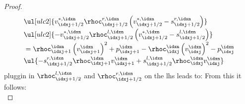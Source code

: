 \begin{proofbox}
\begin{proof}
\begin{align*}
          &\ul[ulc2]{v_{\idxj+1/2}^{*,\idxn}\rhoc_{\idxj+1/2}^{r,\idxn}\left(v_{\idxj+1/2}^{*,\idxn}-s_{\idxj+1/2}^{r,\idxn}\right)}
            \\[-1\jot]
        &\ul[ulc2]{-v_{\idxj+1/2}^{*,\idxn}\rhoc_{\idxj+1/2}^{l,\idxn}\left(v_{\idxj+1/2}^{*,\idxn}-s_{\idxj+1/2}^{l,\idxn}\right)
            }\\[-1\jot]
          &=\rhoc_{\idxj+1}^{\idxn}\left(v_{\idxj+1}^{\idxn}\right)^{2}+p_{\idxj+1}^{\idxn}
            -\rhoc_{\idxj}^{\idxn}\left(v_{\idxj}^{\idxn}\right)^{2}-p_{\idxj}^{\idxn}    \\[-1\jot]
            &\ul{-s_{\idxj+1/2}^{r,\idxn}\rhoc_{\idxj+1}^{\idxn}v_{\idxj+1}^{\idxn}
            +s_{\idxj+1/2}^{l,\idxn}\rhoc_{\idxj}^{\idxn}v_{\idxj}^{\idxn}}
        \end{align*}
        pluggin in $\rhoc_{\idxj+1/2}^{l,\idxn}$ and $\rhoc_{\idxj+1/2}^{r,\idxn}$ on the lhs leads to:
        From this it follows:\\
    \end{proof}
\end{proofbox}
